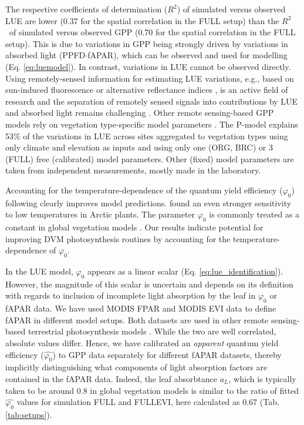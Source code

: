 \documentclass{myreport}
\newcommand{\rsq}{$R^2$}
\begin{document}
The respective coefficients of determination (\rsq ) of simulated versus observed LUE are lower (0.37 for the spatial correlation in the FULL setup) than the \rsq\ of simulated versus observed GPP (0.70 for the spatial correlation in the FULL setup). This is due to variations in GPP being strongly driven by variations in absorbed light (PPFD$\cdot$fAPAR), which can be observed and used for modelling (Eq. \ref{eq:luemodel}). In contrast, variations in LUE cannot be observed directly. Using remotely-sensed information for estimating LUE variations, e.g., based on sun-induced fluorescence \citep{frankenberg18, li18gcb, ryu19rse} or alternative reflectance indices \citep{gamon92, gamon16pnas, Badgley2017-tw}, is an active field of research and the separation of remotely sensed signals into contributions by LUE and absorbed light remains challenging \citep{porcarcastell14, ryu19rse}. Other remote sensing-based GPP models rely on vegetation type-specific model parameters \citep{Zhang2017-yr, running04, jiang16rse}. The P-model explains 53\% of the variations in LUE across sites aggregated to vegetation types using only climate and elevation as inputs and using only one (ORG, BRC) or 3 (FULL) free (calibrated) model parameters. Other (fixed) model parameters are taken from independent measurements, mostly made in the laboratory. %

Accounting for the temperature-dependence of the quantum yield efficiency ($\varphi_0$) following \cite{bernacchi03pce} clearly improves model predictions. \cite{rogers19newphyt} found an even stronger sensitivity to low temperatures in Arctic plants. The parameter $\varphi_0$ is commonly treated as a constant in global vegetation models \citep{rogers17}. Our results indicate potential for improving DVM photosynthesis routines by accounting for the temperature-dependence of $\varphi_0$. 

In the LUE model, $\varphi_0$ appears as a linear scalar  (Eq. \ref{eq:lue_identification}). However, the magnitude of this scalar is uncertain and depends on its definition with regards to inclusion of incomplete light absorption by the leaf in $\varphi_0$ or fAPAR data. We have used MODIS FPAR and MODIS EVI data to define fAPAR in different model setups. Both datasets are used in other remote sensing-based terrestrial photosynthesis models \citep{Zhang2017-yr, jiang16rse}. While the two are well correlated, absolute values differ. Hence, we have calibrated an \textit{apparent} quantum yield efficiency ($\widehat{\varphi_0}$) to GPP data separately for different fAPAR datasets, thereby implicitly distinguishing what components of light absorption factors are contained in the fAPAR data. Indeed, the leaf absorbtance $a_L$, which is typically taken to be around 0.8 in global vegetation models \citep{rogers17} is similar to the ratio of fitted $\widehat{\varphi_0}$ values for simulation FULL and FULL\textunderscore EVI, here calculated as 0.67 (Tab. \ref{tab:setups}).
\end{document}
